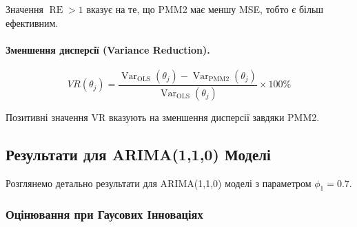 \documentclass[12pt,a4paper]{article}
\DeclareMathOperator{\Var}{Var}
\DeclareMathOperator{\RE}{RE}
\begin{document}
Значення $\RE > 1$ вказує на те, що PMM2 має меншу MSE, тобто є більш ефективним.

\paragraph{Зменшення дисперсії (Variance Reduction).}
\begin{equation}
\label{eq:variance_reduction}
VR(\theta_j) = \frac{\Var_{\text{OLS}}(\theta_j) - \Var_{\text{PMM2}}(\theta_j)}{\Var_{\text{OLS}}(\theta_j)} \times 100\%
\end{equation}

Позитивні значення VR вказують на зменшення дисперсії завдяки PMM2.

\subsection{Результати для ARIMA(1,1,0) Моделі}
\label{subsec:results_arima110}

Розглянемо детально результати для ARIMA(1,1,0) моделі з параметром $\phi_1 = 0.7$.

\subsubsection{Оцінювання при Гаусових Інноваціях}
\end{document}

